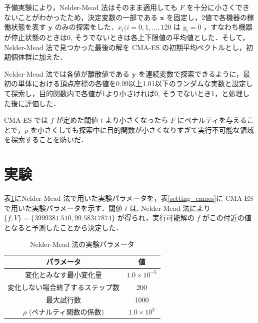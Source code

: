 \documentclass[twocolumn]{jarticle}
\begin{document}
予備実験により，Nelder-Mead 法はそのまま適用しても $F$ を十分に小さくできないことがわかったため，決定変数の一部である $\bm{x}$ を固定し，2値で各機器の稼働状態を表す $\bm{y}$ のみの探索をした．$x_i(i=0,1,\dots,120$ は $y_i=0$ ，すなわち機器が停止状態のときは0, そうでないときは各上下限値の平均値とした．そして，Nelder-Mead 法で見つかった最後の解を CMA-ES の初期平均ベクトルとし，初期個体群に加えた．

Nelder-Mead 法では各値が離散値である $\bm{y}$ を連続変数で探索できるように，最初の単体における頂点座標の各値を0.99以上1.01以下のランダムな実数と設定して探索し，目的関数内で各値が1より小さければ0, そうでないとき1，と処理した後に評価した．

CMA-ES では $f$ が定めた閾値 $t$ より小さくなったら $F$ にペナルティを与えることで，$\rho$ を小さくしても探索中に目的関数が小さくなりすぎて実行不可能な領域を探索することを防いだ．

\section{実験}
表\ref{setting_nelder}にNelder-Mead 法で用いた実験パラメータを，表\ref{setting_cmaes}に CMA-ES で用いた実験パラメータを示す．閾値 $t$ は, Nelder-Mead 法により $\{f, V\}=\{3999381.510, 99.58317874\}$ が得られ，実行可能解の $f$ がこの付近の値となると予測したことから決定した．
\begin{table}[htbp]
    \begin{center}
        \caption{Nelder-Mead 法の実験パラメータ}
        \label{setting_nelder}
        \begin{tabular}{| c | c |} \hline
            パラメータ & 値 \\ \hline
            変化とみなす最小変化量 & $1.0\times10^{-5}$ \\
            変化しない場合終了するステップ数 & 200 \\
            最大試行数 & 1000 \\
            $\rho$ (ペナルティ関数の係数) & $1.0\times10^{3}$\\ \hline
        \end{tabular}
    \end{center}
\end{table}
\end{document}
